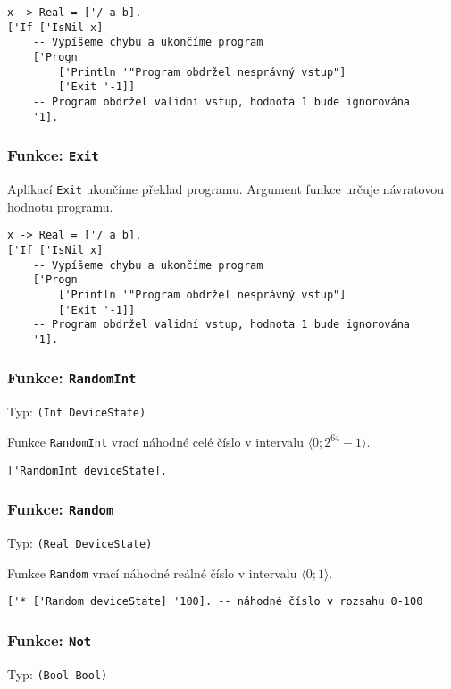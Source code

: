 \begin{lstlisting}[caption={Ukázka využití IsNil}]
x -> Real = ['/ a b].
['If ['IsNil x]
    -- Vypíšeme chybu a ukončíme program
    ['Progn
        ['Println '"Program obdržel nesprávný vstup"]
        ['Exit '-1]]
    -- Program obdržel validní vstup, hodnota 1 bude ignorována
    '1].
\end{lstlisting}

\subsubsection*{Funkce: \lstinline{Exit}}

Aplikací \lstinline{Exit} ukončíme překlad programu. Argument funkce určuje návratovou hodnotu
programu.

\begin{lstlisting}[caption={Ukázka využití Exit}]
x -> Real = ['/ a b].
['If ['IsNil x]
    -- Vypíšeme chybu a ukončíme program
    ['Progn
        ['Println '"Program obdržel nesprávný vstup"]
        ['Exit '-1]]
    -- Program obdržel validní vstup, hodnota 1 bude ignorována
    '1].
\end{lstlisting}

\subsubsection*{Funkce: \lstinline{RandomInt}}
Typ: \lstinline{(Int DeviceState)}

Funkce \lstinline{RandomInt} vrací náhodné celé číslo v intervalu $\bigl \langle 0; 2^{64}-1 \bigr \rangle$.

\begin{lstlisting}[caption={Ukázka využití RandomInt}]
['RandomInt deviceState].
\end{lstlisting}

\subsubsection*{Funkce: \lstinline{Random}}
Typ: \lstinline{(Real DeviceState)}

Funkce \lstinline{Random} vrací náhodné reálné číslo v intervalu $\bigl \langle 0; 1 \bigr \rangle$.

\begin{lstlisting}[caption={Ukázka využití Random}]
['* ['Random deviceState] '100]. -- náhodné číslo v rozsahu 0-100
\end{lstlisting}

\subsubsection*{Funkce: \lstinline{Not}}
Typ: \lstinline{(Bool Bool)}


